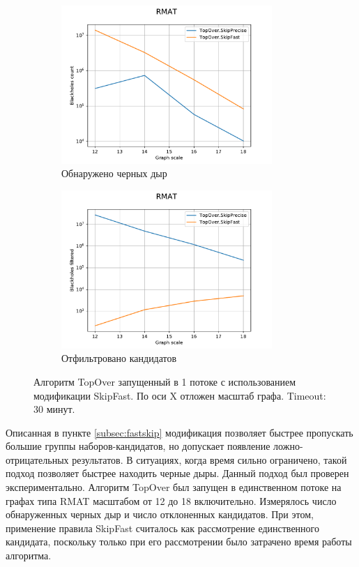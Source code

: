 \documentclass[12pt,a4paper,oneside,openany]{article}
\theoremstyle{definition}
\theoremstyle{lemma}
\theoremstyle{remark}
\begin{document}
\begin{figure}[H]
    \begin{subfigure}{.5\textwidth}
      \centering
      \includegraphics[width=8cm]{images/7_count_RMAT.pdf}
      \caption{Обнаружено черных дыр}
      \label{fig:fastskiprmat:count}
    \end{subfigure}
    \begin{subfigure}{.5\textwidth}
      \centering
      \includegraphics[width=8cm,height=6cm]{images/7_filtered_RMAT.pdf}
      \caption{Отфильтровано кандидатов}
      \label{fig:fastskiprmat:filtered}
    \end{subfigure}
    \caption{Алгоритм TopOver запущенный в 1 потоке с использованием модификации SkipFast. По оси X отложен масштаб графа. Timeout: 30 минут.}
    \label{fig:fastskiprmat}
\end{figure}

Описанная в пункте \ref{subsec:fastskip} модификация позволяет быстрее пропускать большие группы
наборов-кандидатов, но допускает появление ложно-отрицательных результатов.
В ситуациях, когда время сильно ограничено, такой подход позволяет быстрее находить черные дыры.
Данный подход был проверен экспериментально. Алгоритм TopOver был запущен в единственном потоке
на графах типа RMAT масштабом от 12 до 18 включительно. Измерялось число обнаруженных черных
дыр и число отклоненных кандидатов. При этом, применение правила SkipFast считалось
как рассмотрение единственного кандидата, поскольку только при его рассмотрении было
затрачено время работы алгоритма.
\end{document}

